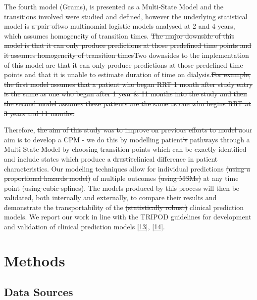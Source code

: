 \documentclass[12pt,PhD,twoside,openright]{muthesis}
\begin{document}
The fourth model (Grams), is presented as a Multi-State Model and the transitions involved were studied and defined, however the underlying statistical model is \sout{a pair of}two multinomial logistic models analysed at 2 and 4 years, which assumes homogeneity of transition times. \sout{The major downside of this model is that it can only produce predictions at those predefined time points and it assumes homogeneity of transition times}Two downsides to the implementation of this model are that it can only produce predictions at those predefined time points and that it is unable to estimate duration of time on dialysis.\sout{For example, the first model assumes that a patient who began RRT 1 month after study entry is the same as one who began after 1 year \& 11 months into the study and then the second model assumes these patients are the same as one who begins RRT at 3 years and 11 months.}

Therefore, \sout{the aim of this study was to improve on previous efforts to model a}our aim is to develop a CPM - we do this by modelling patient\sout{'s} pathways through a Multi-State Model by choosing transition points which can be exactly identified and include states which produce a \sout{drastic}clinical difference in patient characteristics. Our modeling techniques allow for individual predictions \sout{(using a proportional hazards model)} of multiple outcomes \sout{(using MSMs)} at any time point \sout{(using cubic splines)}. The models produced by this process will then be validated, both internally and externally, to compare their results and demonstrate the transportability of the \sout{(statistically robust)} clinical prediction models. We report our work in line with the TRIPOD guidelines for development and validation of clinical prediction models {[}\protect\hyperlink{ref-collins_transparent_2015}{13}{]}, {[}\protect\hyperlink{ref-moons_transparent_2015}{14}{]}.

\hypertarget{methods-6}{%
\section{Methods}\label{methods-6}}

\hypertarget{data-sources}{%
\subsection{Data Sources}\label{data-sources}}
\end{document}
